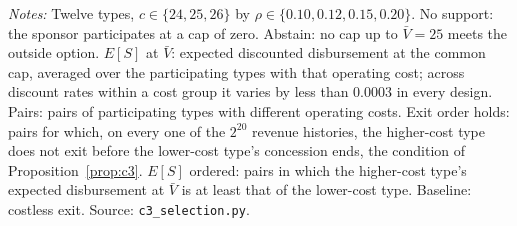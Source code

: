 \begin{table}[htbp]\centering\small
\caption{Sponsor pool by design: participation categories and expected disbursement at the common cap by operating cost}\label{tab:c3design}
\par\smallskip\begin{minipage}{\textwidth}\footnotesize\textit{Notes:} Twelve types, $c \in \{24, 25, 26\}$ by $\rho \in \{0.10, 0.12, 0.15, 0.20\}$. No support: the sponsor participates at a cap of zero. Abstain: no cap up to $\bar V = 25$ meets the outside option. $E[S]$ at $\bar V$: expected discounted disbursement at the common cap, averaged over the participating types with that operating cost; across discount rates within a cost group it varies by less than 0.0003 in every design. Pairs: pairs of participating types with different operating costs. Exit order holds: pairs for which, on every one of the $2^{20}$ revenue histories, the higher-cost type does not exit before the lower-cost type's concession ends, the condition of Proposition~\ref{prop:c3}. $E[S]$ ordered: pairs in which the higher-cost type's expected disbursement at $\bar V$ is at least that of the lower-cost type. Baseline: costless exit. Source: \texttt{c3\_selection.py}.\end{minipage}
\end{table}

